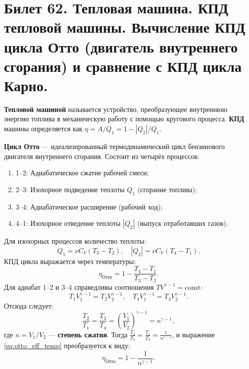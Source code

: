 \section{Билет 62. Тепловая машина. КПД тепловой машины. Вычисление КПД цикла Отто (двигатель внутреннего сгорания) и сравнение с КПД цикла Карно.}

\begin{definition}
\textbf{Тепловой машиной} называется устройство, преобразующее внутреннюю энергию топлива в механическую работу с помощью кругового процесса. \textbf{КПД} машины определяется как $\eta = A/Q_1 = 1 - |Q_2|/Q_1$.
\end{definition}

\begin{theorem}
\textbf{Цикл Отто} --- идеализированный термодинамический цикл бензинового двигателя внутреннего сгорания. Состоит из четырёх процессов:
\begin{enumerate}
    \item 1--2: Адиабатическое сжатие рабочей смеси;
    \item 2--3: Изохорное подведение теплоты $Q_1$ (сгорание топлива);
    \item 3--4: Адиабатическое расширение (рабочий ход);
    \item 4--1: Изохорное отведение теплоты $|Q_2|$ (выпуск отработавших газов).
\end{enumerate}
Для изохорных процессов количество теплоты:
\begin{equation}
    Q_1 = \nu C_V (T_3 - T_2), \quad |Q_2| = \nu C_V (T_4 - T_1).
\end{equation}
КПД цикла выражается через температуры:
\begin{equation}
    \eta_{\text{Отто}} = 1 - \frac{T_4 - T_1}{T_3 - T_2}. \label{eq:otto_eff_temp}
\end{equation}
Для адиабат 1--2 и 3--4 справедливы соотношения $T V^{\gamma-1} = \text{const}$:
\begin{equation}
    T_1 V_1^{\gamma-1} = T_2 V_2^{\gamma-1}, \quad T_4 V_1^{\gamma-1} = T_3 V_2^{\gamma-1}.
\end{equation}
Отсюда следует:
\begin{equation}
    \frac{T_2}{T_1} = \frac{T_3}{T_4} = \left(\frac{V_1}{V_2}\right)^{\gamma-1} = n^{\gamma-1},
\end{equation}
где $n = V_1/V_2$ --- \textbf{степень сжатия}. Тогда $\frac{T_4}{T_3} = \frac{T_1}{T_2} = \frac{1}{n^{\gamma-1}}$, и выражение \eqref{eq:otto_eff_temp} преобразуется к виду:
\begin{equation}
    \eta_{\text{Отто}} = 1 - \frac{1}{n^{\gamma-1}}. \label{eq:otto_eff_final}
\end{equation}
\end{theorem}

